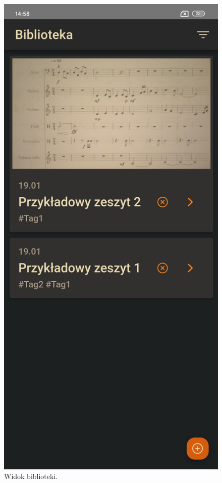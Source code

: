 \begin{figure}[H]
	\begin{center}
		\includegraphics[scale=0.2]{media/LibraryView.jpg}
	\end{center}
	\caption{Widok biblioteki.}
	\label{rys:library-view}
\end{figure}


